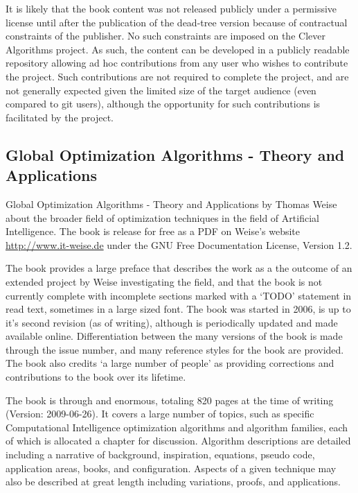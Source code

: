 \documentclass[a4paper, 11pt]{article}
\begin{document}
It is likely that the book content was not released publicly under a permissive license until after the publication of the dead-tree version because of contractual constraints of the publisher. No such constraints are imposed on the Clever Algorithms project. As such, the content can be developed in a publicly readable repository allowing ad hoc contributions from any user who wishes to contribute the project. Such contributions are not required to complete the project, and are not generally expected given the limited size of the target audience (even compared to git users), although the opportunity for such contributions is facilitated by the project.


% 
% 
\subsection{Global Optimization Algorithms - Theory and Applications}
Global Optimization Algorithms - Theory and Applications by Thomas Weise \cite{Weise2007} about the broader field of optimization techniques in the field of Artificial Intelligence. The book is release for free as a PDF on Weise's website \url{http://www.it-weise.de} under the GNU Free Documentation License, Version 1.2. 

The book provides a large preface that describes the work as a the outcome of an extended project by Weise investigating the field, and that the book is not currently complete with incomplete sections marked with a `TODO' statement in read text, sometimes in a large sized font. The book was started in 2006, is up to it's second revision (as of writing), although is periodically updated and made available online. Differentiation between the many versions of the book is made through the issue number, and many reference styles for the book are provided. The book also credits `a large number of people' as providing corrections and contributions to the book over its lifetime.

The book is through and enormous, totaling 820 pages at the time of writing (Version: 2009-06-26). It covers a large number of topics, such as specific Computational Intelligence optimization algorithms and algorithm families, each of which is allocated a chapter for discussion. Algorithm descriptions are detailed including a narrative of background, inspiration, equations, pseudo code, application areas, books, and configuration. Aspects of a given technique may also be described at great length including variations, proofs, and applications.
\end{document}
